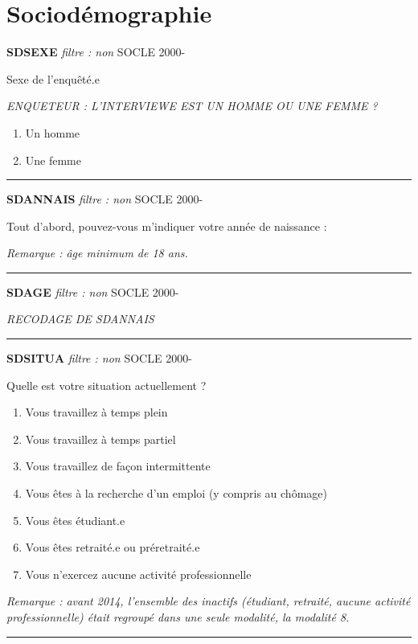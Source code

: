 \documentclass[12pt,a4paper]{reedthesis}
\providecommand{\tightlist}{%
  \setlength{\itemsep}{0pt}\setlength{\parskip}{0pt}}
\begin{document}
\hypertarget{socioduxe9mographie}{%
\section{Sociodémographie}\label{socioduxe9mographie}}

\textbf{SDSEXE} \emph{filtre : non} SOCLE 2000-

Sexe de l'enquêté.e

\emph{ENQUETEUR : L'INTERVIEWE EST UN HOMME OU UNE FEMME ?}
\begin{enumerate}
\def\labelenumi{\arabic{enumi}.}
\tightlist
\item
  Un homme
\item
  Une femme
\end{enumerate}
\begin{center}\rule{0.5\linewidth}{0.5pt}\end{center}

\textbf{SDANNAIS} \emph{filtre : non} SOCLE 2000-

Tout d'abord, pouvez-vous m'indiquer votre année de naissance :

\emph{Remarque : âge minimum de 18 ans.}
\begin{center}\rule{0.5\linewidth}{0.5pt}\end{center}

\textbf{SDAGE} \emph{filtre : non} SOCLE 2000-

\emph{RECODAGE DE SDANNAIS}
\begin{center}\rule{0.5\linewidth}{0.5pt}\end{center}

\textbf{SDSITUA} \emph{filtre : non} SOCLE 2000-

Quelle est votre situation actuellement ?
\begin{enumerate}
\def\labelenumi{\arabic{enumi}.}
\tightlist
\item
  Vous travaillez à temps plein
\item
  Vous travaillez à temps partiel
\item
  Vous travaillez de façon intermittente
\item
  Vous êtes à la recherche d'un emploi (y compris au chômage)
\item
  Vous êtes étudiant.e
\item
  Vous êtes retraité.e ou préretraité.e
\item
  Vous n'exercez aucune activité professionnelle
\end{enumerate}
\emph{Remarque : avant 2014, l'ensemble des inactifs (étudiant, retraité, aucune activité professionnelle) était regroupé dans une seule modalité, la modalité 8.}
\begin{center}\rule{0.5\linewidth}{0.5pt}\end{center}
\end{document}
